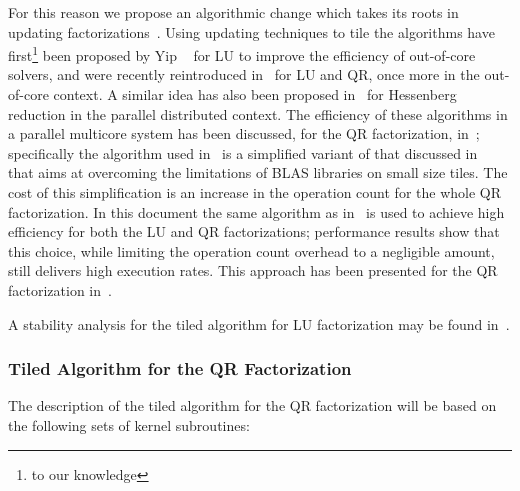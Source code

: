 \documentclass{article}
\begin{document}
For this reason we propose an algorithmic change which takes its roots
in updating factorizations~\cite{golubvanloan,stew:98}.  Using
updating techniques to tile the algorithms have first\footnote{to our
  knowledge} been proposed by Yip ~\cite{yip_ooc} for LU to improve
the efficiency of out-of-core solvers, and were recently reintroduced
in~\cite{DBLP:conf/para/JoffrainQG04,vdgooclu,1055534} for LU and QR, once more in the out-of-core
context. A similar idea has also been proposed in~\cite{210517} for
Hessenberg reduction in the parallel distributed context. The
efficiency of these algorithms in a parallel multicore system has been
discussed, for the QR factorization, in~\cite{tiledqr}; specifically
the algorithm used in~\cite{tiledqr} is a simplified variant of that
discussed in~\cite{1055534} that aims at overcoming the limitations of
BLAS libraries on small size tiles. The cost of this simplification is
an increase in the operation count for the whole QR factorization. In
this document the same algorithm as in~\cite{1055534} is used to
achieve high efficiency for both the LU and QR factorizations;
performance results show that this choice, while limiting the
operation count overhead to a negligible amount, still delivers high
execution rates. This approach has been presented for the QR
factorization in~\cite{vdgqr}.

A stability analysis for the tiled  algorithm for LU factorization may be found
in~\cite{vdgooclu}.

\subsubsection{Tiled Algorithm for the QR Factorization}
The description of the tiled algorithm for the QR factorization will be based on
the following sets of kernel subroutines:
\end{document}
